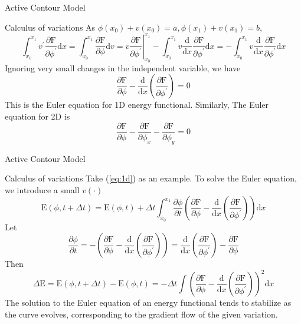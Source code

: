 \begin{frame}{Active Contour Model}
	\begin{block}{Calculus of variations}
		As $\phi(x_0)+v(x_0)=a,\phi(x_1)+v(x_1)=b$,
		\begin{equation}
			\int_{x_0}^{x_1} v^{\prime} \frac{\partial \mathrm{F}}{\partial \phi^{\prime}} \mathrm{d} x=\int_{x_0}^{x_1} \frac{\partial \mathrm{F}}{\partial \phi} \mathrm{d} v=\left.v \frac{\partial \mathrm{F}}{\partial \phi^{\prime}}\right|_{x_0} ^{x_1}-\int_{x_0}^{x_1} v \frac{\mathrm{d}}{\mathrm{d} x} \frac{\partial \mathrm{F}}{\partial \phi^{\prime}} \mathrm{d} x=-\int_{x_0}^{x_1} v \frac{\mathrm{d}}{\mathrm{d} x} \frac{\partial \mathrm{F}}{\partial \phi^{\prime}} \mathrm{d} x
		\end{equation}
		Ignoring very small changes in the independent variable, we have
		\begin{equation}
			\frac{\partial \mathrm{F}}{\partial \phi}-\frac{\mathrm{d}}{\mathrm{d}x}(\frac{\partial \mathrm{F}}{\partial \phi^\prime})=0
			\label{eq:1d}
		\end{equation}
		This is the Euler equation for 1D energy functional. Similarly, The Euler equation for 2D is
		\begin{equation}
			\frac{\partial \mathrm{F}}{\partial \phi}-\frac{\partial \mathrm{F}}{\partial \phi_x}-\frac{\partial \mathrm{F}}{\partial \phi_y}=0
		\end{equation}
	\end{block}
\end{frame}

\begin{frame}{Active Contour Model}
	\begin{block}{Calculus of variations}
		Take (\ref{eq:1d}) as an example. To solve the Euler equation, we introduce a small $v(\cdot)$
		\begin{equation}
			\mathrm{E}(\phi, t+\Delta t)=\mathrm{E}(\phi, t)+\Delta t \int_{x_0}^{x_1} \frac{\partial \phi}{\partial t}\left(\frac{\partial \mathrm{F}}{\partial \phi}-\frac{\mathrm{d}}{\mathrm{d} x}\left(\frac{\partial \mathrm{F}}{\partial \phi^{\prime}}\right)\right) \mathrm{d} x
		\end{equation}
		Let
		\begin{equation}
			\frac{\partial \phi}{\partial t}=-\left(\frac{\partial \mathrm{F}}{\partial \phi}-\frac{\mathrm{d}}{\mathrm{d} x}\left(\frac{\partial \mathrm{F}}{\partial \phi^{\prime}}\right)\right)=\frac{\mathrm{d}}{\mathrm{d} x}\left(\frac{\partial \mathrm{F}}{\partial \phi^{\prime}}\right)-\frac{\partial \mathrm{F}}{\partial \phi}
		\end{equation}
		Then
		\begin{equation}
			\Delta \mathrm{E}=\mathrm{E}(\phi,t+\Delta t)-\mathrm{E}(\phi,t)=-\Delta t\int\left(\frac{\partial \mathrm{F}}{\partial \phi}-\frac{\mathrm{d}}{\mathrm{d} x}\left(\frac{\partial \mathrm{F}}{\partial \phi^{\prime}}\right)\right)^2\mathrm{d}x
		\end{equation}
		The solution to the Euler equation of an energy functional tends to stabilize as the curve evolves, corresponding to the gradient flow of the given variation.
	\end{block}
\end{frame}

